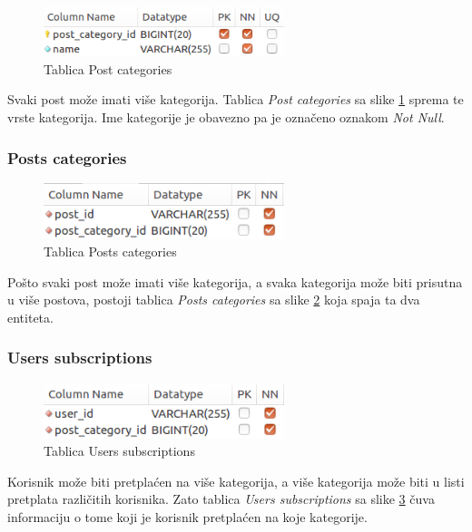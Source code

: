 \documentclass[zavrsni, numeric]{fer}
\begin{document}
\begin{figure}[H]
	\centering
	\includegraphics[width=7cm]{slike/t-post_categories.png}
	\caption{Tablica Post categories}
	\label{fig:t-post_categories}
\end{figure}

Svaki post može imati više kategorija. Tablica \textit{Post categories} sa slike \ref{fig:t-post_categories} sprema te vrste kategorija. Ime kategorije je obavezno pa je označeno oznakom \textit{Not Null}.

\subsubsection{Posts categories}

\begin{figure}[H]
	\centering
	\includegraphics[width=7cm]{slike/t-posts_categories.png}
	\caption{Tablica Posts categories}
	\label{fig:t-posts_categories}
\end{figure}

Pošto svaki post može imati više kategorija, a svaka kategorija može biti prisutna u više postova, postoji tablica \textit{Posts categories} sa slike \ref{fig:t-posts_categories} koja spaja ta dva entiteta.

\subsubsection{Users subscriptions}

\begin{figure}[H]
	\centering
	\includegraphics[width=7cm]{slike/t-users_subscriptions.png}
	\caption{Tablica Users subscriptions}
	\label{fig:t-users_subscriptions}
\end{figure}

Korisnik može biti pretplaćen na više kategorija, a više kategorija može biti u listi pretplata različitih korisnika. Zato tablica \textit{Users subscriptions} sa slike \ref{fig:t-users_subscriptions} čuva informaciju o tome koji je korisnik pretplaćen na koje kategorije.
\end{document}

